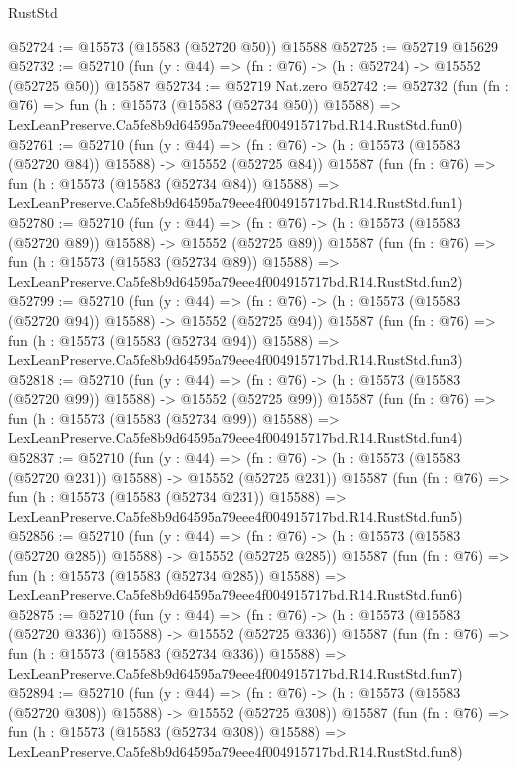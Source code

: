 \begin{lexlean}{RustStd}
\begin{coremodule}
@52724 := @15573 (@15583 (@52720 @50)) @15588
@52725 := @52719 @15629
@52732 := @52710 (fun (y : @44) => (fn : @76) -> (h : @52724) -> @15552 (@52725 @50)) @15587
@52734 := @52719 Nat.zero
@52742 := @52732
    (fun (fn : @76) =>
    fun (h : @15573 (@15583 (@52734 @50)) @15588) =>
    LexLeanPreserve.Ca5fe8b9d64595a79eee4f004915717bd.R14.RustStd.fun0)
@52761 := @52710
    (fun (y : @44) =>
    (fn : @76) -> (h : @15573 (@15583 (@52720 @84)) @15588) -> @15552 (@52725 @84))
    @15587
    (fun (fn : @76) =>
    fun (h : @15573 (@15583 (@52734 @84)) @15588) =>
    LexLeanPreserve.Ca5fe8b9d64595a79eee4f004915717bd.R14.RustStd.fun1)
@52780 := @52710
    (fun (y : @44) =>
    (fn : @76) -> (h : @15573 (@15583 (@52720 @89)) @15588) -> @15552 (@52725 @89))
    @15587
    (fun (fn : @76) =>
    fun (h : @15573 (@15583 (@52734 @89)) @15588) =>
    LexLeanPreserve.Ca5fe8b9d64595a79eee4f004915717bd.R14.RustStd.fun2)
@52799 := @52710
    (fun (y : @44) =>
    (fn : @76) -> (h : @15573 (@15583 (@52720 @94)) @15588) -> @15552 (@52725 @94))
    @15587
    (fun (fn : @76) =>
    fun (h : @15573 (@15583 (@52734 @94)) @15588) =>
    LexLeanPreserve.Ca5fe8b9d64595a79eee4f004915717bd.R14.RustStd.fun3)
@52818 := @52710
    (fun (y : @44) =>
    (fn : @76) -> (h : @15573 (@15583 (@52720 @99)) @15588) -> @15552 (@52725 @99))
    @15587
    (fun (fn : @76) =>
    fun (h : @15573 (@15583 (@52734 @99)) @15588) =>
    LexLeanPreserve.Ca5fe8b9d64595a79eee4f004915717bd.R14.RustStd.fun4)
@52837 := @52710
    (fun (y : @44) =>
    (fn : @76) -> (h : @15573 (@15583 (@52720 @231)) @15588) -> @15552 (@52725 @231))
    @15587
    (fun (fn : @76) =>
    fun (h : @15573 (@15583 (@52734 @231)) @15588) =>
    LexLeanPreserve.Ca5fe8b9d64595a79eee4f004915717bd.R14.RustStd.fun5)
@52856 := @52710
    (fun (y : @44) =>
    (fn : @76) -> (h : @15573 (@15583 (@52720 @285)) @15588) -> @15552 (@52725 @285))
    @15587
    (fun (fn : @76) =>
    fun (h : @15573 (@15583 (@52734 @285)) @15588) =>
    LexLeanPreserve.Ca5fe8b9d64595a79eee4f004915717bd.R14.RustStd.fun6)
@52875 := @52710
    (fun (y : @44) =>
    (fn : @76) -> (h : @15573 (@15583 (@52720 @336)) @15588) -> @15552 (@52725 @336))
    @15587
    (fun (fn : @76) =>
    fun (h : @15573 (@15583 (@52734 @336)) @15588) =>
    LexLeanPreserve.Ca5fe8b9d64595a79eee4f004915717bd.R14.RustStd.fun7)
@52894 := @52710
    (fun (y : @44) =>
    (fn : @76) -> (h : @15573 (@15583 (@52720 @308)) @15588) -> @15552 (@52725 @308))
    @15587
    (fun (fn : @76) =>
    fun (h : @15573 (@15583 (@52734 @308)) @15588) =>
    LexLeanPreserve.Ca5fe8b9d64595a79eee4f004915717bd.R14.RustStd.fun8)

\end{coremodule}
\end{lexlean}
